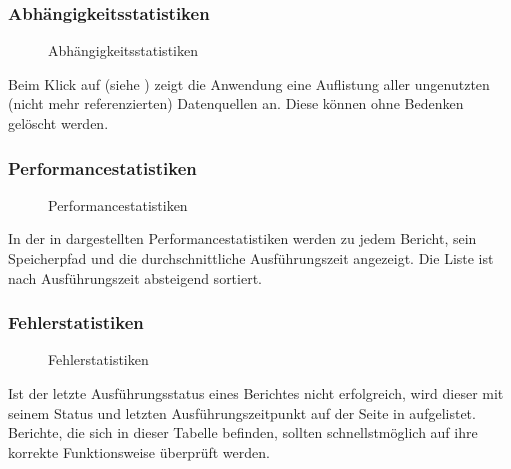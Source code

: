 \subsubsection{Abhängigkeitsstatistiken}
\label{app:Abhaengigkeit}
\begin{figure}[htb]
    \centering
    \caption{Abhängigkeitsstatistiken}
    \label{fig:Abhaengigkeit}
\end{figure}
Beim Klick auf  (siehe ) zeigt die Anwendung eine Auflistung aller ungenutzten (nicht mehr referenzierten) Datenquellen an. Diese können ohne Bedenken gelöscht werden.

\subsubsection{Performancestatistiken}
\label{app:Performance}
\begin{figure}[htb]
    \centering
    \caption{Performancestatistiken}
    \label{fig:Performance}
\end{figure}
In der in  dargestellten Performancestatistiken werden zu jedem Bericht, sein Speicherpfad und die durchschnittliche Ausführungszeit angezeigt. Die Liste ist nach Ausführungszeit absteigend sortiert.

\subsubsection{Fehlerstatistiken}
\label{app:Fehler}
\begin{figure}[htb]
    \centering
    \caption{Fehlerstatistiken}
    \label{fig:Fehler}
\end{figure}
Ist der letzte Ausführungsstatus eines Berichtes nicht erfolgreich, wird dieser mit seinem Status und letzten Ausführungszeitpunkt auf der Seite in  aufgelistet. Berichte, die sich in dieser Tabelle befinden, sollten schnellstmöglich auf ihre korrekte Funktionsweise überprüft werden.
